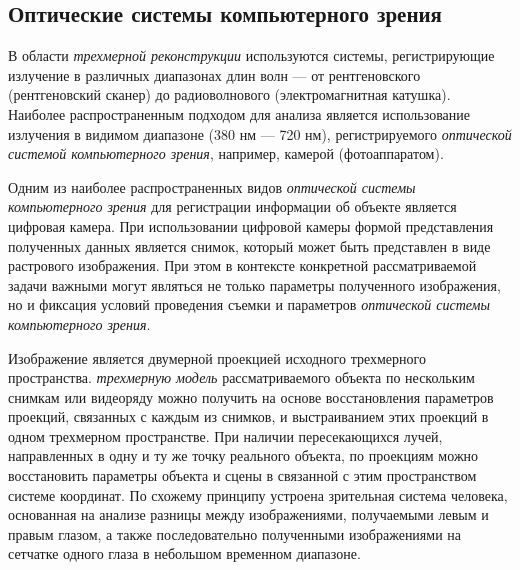\subsection{Оптические системы компьютерного зрения}
\label{sec_3d_models_computervision_opt_systems}

В области \textit{трехмерной реконструкции} используются системы, регистрирующие излучение в различных диапазонах длин волн --- от рентгеновского (рентгеновский сканер) до радиоволнового (электромагнитная катушка). Наиболее распространенным подходом для анализа является использование излучения в видимом диапазоне (380 нм --- 720 нм), регистрируемого \textit{оптической системой компьютерного зрения}, например, камерой (фотоаппаратом). 

\begin{SCn}
\end{SCn}

Одним из наиболее распространенных видов \textit{оптической системы компьютерного зрения} для регистрации информации об объекте является цифровая камера. При использовании цифровой камеры формой представления полученных данных является снимок, который может быть представлен в виде растрового изображения. При этом в контексте конкретной рассматриваемой задачи важными могут являться не только параметры полученного изображения, но и фиксация условий проведения съемки и параметров \textit{оптической системы компьютерного зрения}.  

Изображение является двумерной проекцией исходного трехмерного пространства. \textit{трехмерную модель} рассматриваемого объекта по нескольким снимкам или видеоряду можно получить на основе восстановления параметров проекций, связанных с каждым из снимков, и выстраиванием этих проекций в одном трехмерном пространстве. При наличии пересекающихся лучей, направленных в одну и ту же точку реального объекта, по проекциям можно восстановить параметры объекта и сцены в связанной с этим пространством системе координат. По схожему принципу устроена зрительная система человека, основанная на анализе разницы между изображениями, получаемыми левым и правым глазом, а также последовательно полученными изображениями на сетчатке одного глаза в небольшом временном диапазоне.

